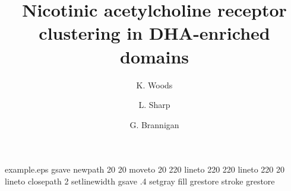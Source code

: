 %
%
%
%
%
\begin{filecontents*}{example.eps}
gsave
newpath
  20 20 moveto
  20 220 lineto
  220 220 lineto
  220 20 lineto
closepath
2 setlinewidth
gsave
  .4 setgray fill
grestore
stroke
grestore
\end{filecontents*}
%
\RequirePackage{fix-cm}
%
\documentclass[smallextended]{svjour3}       %
%
\smartqed  %
%
\usepackage{graphicx}
%
%
%
%
%
\newcommand{\bsat}{b_{\mathrm{sat}}}
\newcommand{\qsat}{Q_{\mathrm{sat}}}
\newcommand{\qpufa}{Q_{\mathrm{DHA}}}
\newcommand{\xsat}{x_{\mathrm{sat}}}
\newcommand{\xch}{x_{\mathrm{Chol}}}
\newcommand{\nbound}{b_{\mathrm{tot}}}


\title{Nicotinic acetylcholine receptor clustering in DHA-enriched domains%
}


\author{K. Woods         \and
        L. Sharp \and 
        G. Brannigan %
}

